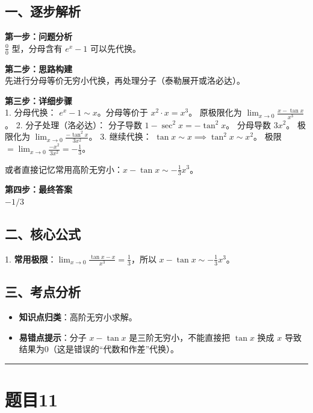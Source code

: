 \documentclass[12pt, a4paper]{ctexart}
\newcommand{\TopSeparator}{
    \par\noindent\rule{\textwidth}{1.5pt}\vspace{0.5em} %
}
\newenvironment{RedAnalysis}{
    \par
    \color{red} %
}{
    \par
    \color{black} %
}
\begin{document}
\begin{RedAnalysis}

\subsection*{一、逐步解析}

\textbf{第一步：问题分析} \\
$\frac{0}{0}$ 型，分母含有 $e^x-1$ 可以先代换。

\textbf{第二步：思路构建} \\
先进行分母等价无穷小代换，再处理分子（泰勒展开或洛必达）。

\textbf{第三步：详细步骤} \\
1. 分母代换：
   $e^x - 1 \sim x$。分母等价于 $x^2 \cdot x = x^3$。
   原极限化为 $\lim_{x \to 0} \frac{x - \tan x}{x^3}$。
2. 分子处理（洛必达）：
   分子导数 $1 - \sec^2 x = -\tan^2 x$。
   分母导数 $3x^2$。
   极限化为 $\lim_{x \to 0} \frac{-\tan^2 x}{3x^2}$。
3. 继续代换：
   $\tan x \sim x \implies \tan^2 x \sim x^2$。
   极限 $= \lim_{x \to 0} \frac{-x^2}{3x^2} = -\frac{1}{3}$。
   
   或者直接记忆常用高阶无穷小：$x - \tan x \sim -\frac{1}{3}x^3$。

\textbf{第四步：最终答案} \\
$-1/3$

\subsection*{二、核心公式}
1. \textbf{常用极限}：$\lim_{x\to 0} \frac{\tan x - x}{x^3} = \frac{1}{3}$，所以 $x-\tan x \sim -\frac{1}{3}x^3$。

\subsection*{三、考点分析}
\begin{itemize}
    \item \textbf{知识点归类}：高阶无穷小求解。
    \item \textbf{易错点提示}：分子 $x-\tan x$ 是三阶无穷小，不能直接把 $\tan x$ 换成 $x$ 导致结果为0（这是错误的“代数和作差”代换）。
\end{itemize}

\end{RedAnalysis}

\vspace{2em}

\TopSeparator
\section*{题目11}
\end{document}
